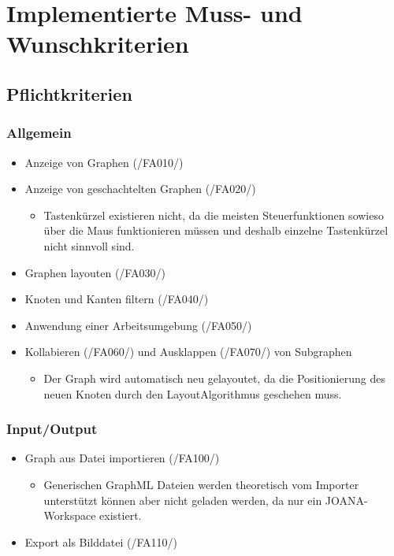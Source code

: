 \chapter{Implementierte Muss- und Wunschkriterien}
\label{ch:implkrit}

\section{Pflichtkriterien}

\subsection{Allgemein}
\begin{itemize}
	\item Anzeige von Graphen (/FA010/)
	\item Anzeige von geschachtelten Graphen (/FA020/)
		\begin{itemize}
			\item Tastenkürzel existieren nicht, da die meisten Steuerfunktionen sowieso über die Maus funktionieren müssen und deshalb einzelne Tastenkürzel nicht sinnvoll sind.
		\end{itemize}
	\item Graphen layouten (/FA030/)
	\item Knoten und Kanten filtern (/FA040/)
	\item Anwendung einer Arbeitsumgebung (/FA050/)
	\item Kollabieren  (/FA060/) und Ausklappen (/FA070/) von Subgraphen
		\begin{itemize}
			\item Der Graph wird automatisch neu gelayoutet, da die Positionierung des neuen Knoten durch den LayoutAlgorithmus geschehen muss.
		\end{itemize}
\end{itemize}

\subsection{Input/Output}
\begin{itemize}
	\item Graph aus Datei importieren (/FA100/)
		\begin{itemize}
			\item Generischen GraphML Dateien werden theoretisch vom Importer unterstützt können aber nicht geladen werden, da nur ein JOANA-Workspace existiert.
		\end{itemize}
	\item Export als Bilddatei (/FA110/)
\end{itemize}

